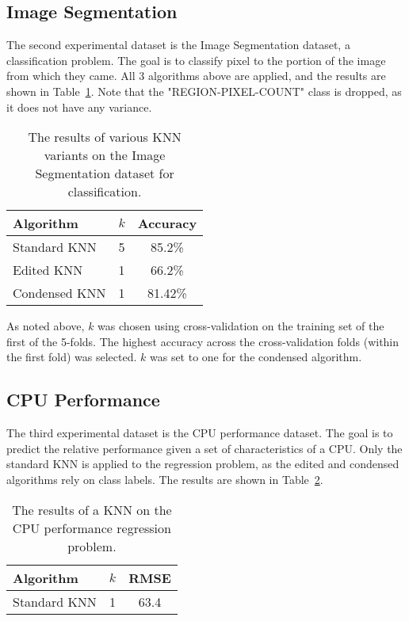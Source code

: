 \documentclass{amsart}
\begin{document}
    \subsection*{Image Segmentation}
    The second experimental dataset is the Image Segmentation dataset\cite{image_dataset}, a classification problem. The goal is to
    classify pixel to the portion of the image from which they came. All 3 algorithms above are applied,
    and the results are shown in Table~\ref{image_segmentation_results}. Note that the "REGION-PIXEL-COUNT"
    class is dropped, as it does not have any variance.
    \begin{table}[H]
    \begin{tabular}{lcc}
        Algorithm     & $k$ & Accuracy \\
        \hline
        Standard KNN  & 5 & 85.2\% \\
        Edited KNN    & 1 & 66.2\% \\
        Condensed KNN & 1 & 81.42\% \\
    \end{tabular}
    \label{image_segmentation_results}
    \caption{The results of various KNN variants on the Image Segmentation dataset for classification.}
    \end{table}
    As noted above, $k$ was chosen using cross-validation on the training set of the first of the 5-folds. The highest
    accuracy across the cross-validation folds (within the first fold) was selected. $k$ was set to one for the
    condensed algorithm.

    \subsection*{CPU Performance}
    The third experimental dataset is the CPU performance dataset\cite{cpu_dataset}. The goal is to predict the relative performance
    given a set of characteristics of a CPU. Only the standard KNN is applied to the regression problem, as the edited
    and condensed algorithms rely on class labels. The results are shown in Table~\ref{cpu_performance_results}.
    \begin{table}[H]
    \begin{tabular}{lcc}
        Algorithm     & $k$ & RMSE \\
        \hline
        Standard KNN  & 1 & 63.4
    \end{tabular}
    \label{cpu_performance_results}
    \caption{The results of a KNN on the CPU performance regression problem.}
    \end{table}
\end{document}
